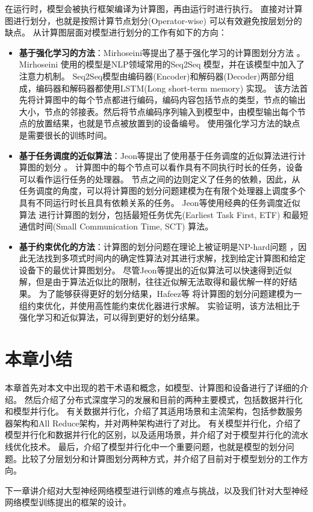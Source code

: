 在运行时，模型会被执行框架编译为计算图，再由运行时进行执行。
直接对计算图进行划分，也就是按照计算节点划分(Operator-wise) 可以有效避免按层划分的缺点。
从计算图层面对模型进行划分的工作有如下的方向：
\begin{itemize}
	\item \textbf{基于强化学习的方法}：Mirhoseini等提出了基于强化学习的计算图划分方法 。
	Mirhoseini 使用的模型是NLP领域常用的Seq2Seq  模型，并在该模型中加入了注意力机制。
	Seq2Seq模型由编码器(Encoder)和解码器(Decoder)两部分组成，编码器和解码器都使用LSTM(Long short-term memory)  实现。
	该方法首先将计算图中的每个节点都进行编码，编码内容包括节点的类型，节点的输出大小，节点的邻接表。然后将节点编码序列输入到模型中，由模型输出每个节点的放置结果，也就是节点被放置到的设备编号。
	使用强化学习方法的缺点是需要很长的训练时间。
	\item \textbf{基于任务调度的近似算法}：Jeon等提出了使用基于任务调度的近似算法进行计算图的划分 。
	计算图中的每个节点可以看作具有不同执行时长的任务，设备可以看作运行任务的处理器。
	节点之间的边则定义了任务的依赖，因此，从任务调度的角度，可以将计算图的划分问题建模为在有限个处理器上调度多个具有不同运行时长且具有依赖关系的任务。
	Jeon等使用经典的任务调度近似算法  进行计算图的划分，包括最短任务优先(Earliest Task First, ETF) 和最短通信时间(Small Communication Time, SCT) 算法。
	\item \textbf{基于约束优化的方法}：计算图的划分问题在理论上被证明是NP-hard问题  ，因此无法找到多项式时间内的确定性算法对其进行求解，找到给定计算图和给定设备下的最优计算图划分。
	尽管Jeon等提出的近似算法可以快速得到近似解，但是由于算法近似比的限制，往往近似解无法取得和最优解一样的好结果。
	为了能够获得更好的划分结果，Hafeez等  将计算图的划分问题建模为一组约束优化，并使用高性能约束优化器进行求解。
	实验证明，该方法相比于强化学习和近似算法，可以得到更好的划分结果。

\end{itemize}

\section{本章小结}

本章首先对本文中出现的若干术语和概念，如模型、计算图和设备进行了详细的介绍。
然后介绍了分布式深度学习的发展和目前的两种主要模式，包括数据并行化和模型并行化。
有关数据并行化，介绍了其适用场景和主流架构，包括参数服务器架构和All Reduce架构，并对两种架构进行了对比。
有关模型并行化，介绍了模型并行化和数据并行化的区别，以及适用场景，并介绍了对于模型并行化的流水线优化技术。
最后，介绍了模型并行化中一个重要问题，也就是模型的划分问题。比较了分层划分和计算图划分两种方式，并介绍了目前对于模型划分的工作方向。

下一章讲介绍对大型神经网络模型进行训练的难点与挑战，以及我们针对大型神经网络模型训练提出的\sys{}框架的设计。 